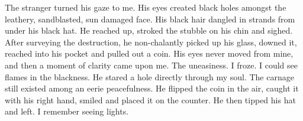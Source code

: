 The stranger turned his gaze to me. His eyes created black holes
amongst the leathery, sandblasted, sun damaged face. His black hair
dangled in strands from under his black hat. He reached up, stroked
the stubble on his chin and sighed. After surveying the
destruction, he non-chalantly picked up his glass, downed it,
reached into his pocket and pulled out a coin. His eyes never moved
from mine, and then a moment of clarity came upon me. The
uneasiness. I froze. I could see flames in the blackness. He stared
a hole directly through my soul. The carnage still existed among an
eerie peacefulness. He flipped the coin in the air, caught it with
his right hand, smiled and placed it on the counter. He then tipped
his hat and left. I remember seeing lights. 

 



